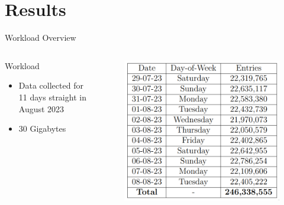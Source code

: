 \documentclass[xcolor=dvipsnames,table]{beamer}
\begin{document}
\section{Results}
\begin{frame}{Workload Overview}
        \begin{columns}
                \begin{block}{Workload}
                        \begin{itemize}
                                \item Data collected for 11 days straight in August 2023 
                                \item 30 Gigabytes 
                        \end{itemize}
                \end{block}
                \begin{figure}[h]
                        \centering
                        \includegraphics[width=\textwidth]{images/workload.png}
                \end{figure}
        \end{columns}
\end{frame}
\end{document}
